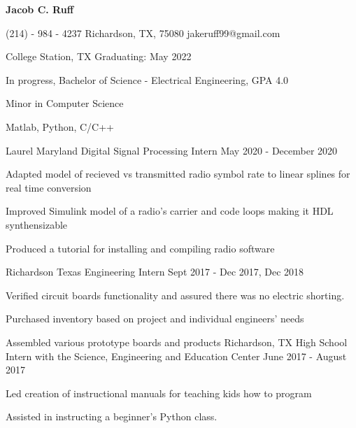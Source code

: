 \documentclass[11pt]{article} %
\begin{document}
\centerline{{\Huge \bf Jacob C. Ruff}}

\bigskip

	{(214) - 984 - 4237}
        {Richardson, TX, 75080}
        {jakeruff99@gmail.com}


\begin{description}
\squish
{}
           {College Station, TX}
           {Graduating: May 2022}


In progress, Bachelor of Science - Electrical Engineering, GPA 4.0

Minor in Computer Science

\end{description}


      {Matlab, Python, C/C++}



\begin{description}
\squish

	   {Laurel Maryland}
           {Digital Signal Processing Intern}
           {May 2020 - December 2020}

	   Adapted model of recieved  vs transmitted radio symbol rate to linear splines for real time conversion

	   Improved Simulink model of a radio's carrier and code loops making it HDL synthensizable

	   Produced a tutorial for installing and compiling radio software

	   {Richardson Texas}
           {Engineering Intern}
           {Sept 2017 - Dec 2017, Dec 2018}

	Verified circuit boards functionality and assured there was no electric shorting.

	Purchased inventory based on project and individual engineers' needs

	Assembled various prototype boards and products
		{Richardson, TX}
		{High School Intern with the Science, Engineering and Education Center}
		{June 2017 - August 2017}

		Led creation of instructional manuals for teaching kids how to program

		Assisted in instructing a beginner's Python class.

\end{description}
\end{document}
